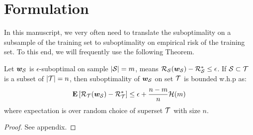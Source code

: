 \section{Formulation}

In this manuscript, we very often need to translate the
suboptimality on a subsample of the training set to suboptimality on empirical
risk of the training set. To this end, we will frequently use the following
Theorem.
 \begin{theorem} \label{theorem:generalization_bound_on_subset}
 		Let $\w_\S$ is $\epsilon$-suboptimal on sample $|\S| = m$, means 
 		$\risk_\S(\w_\S) - \risk_\S^* \le \epsilon$. 
 		If $\S \subset \T$ is a subset of $|\T| = n$, then suboptimality of $\w_\S$
 		on set $\T$ is bounded w.h.p as: 
 		\begin{align}
			\E \left[ \risk_\T(\w_\S) - \risk_\T^*\right] \le \epsilon +
			\frac{n-m}{n} \bound(m)
		\end{align}
		where expectation is over random choice of superset $\T$ with size $n$. 
 \end{theorem}
\begin{proof}
See appendix.
\end{proof}

